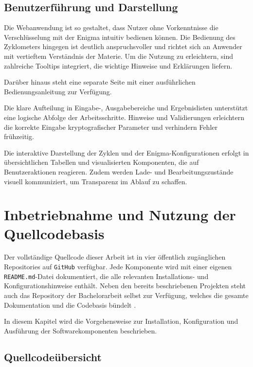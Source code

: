 \documentclass[12pt, ngerman, a4paper, numbers=noenddot]{article}
\begin{document}
\subsection{Benutzerführung und Darstellung}

Die Webanwendung ist so gestaltet, dass Nutzer ohne Vorkenntnisse die Verschlüsselung mit der Enigma intuitiv bedienen können. Die Bedienung des Zyklometers hingegen ist deutlich anspruchsvoller und richtet sich an Anwender mit vertieftem Verständnis der Materie. Um die Nutzung zu erleichtern, sind zahlreiche Tooltips integriert, die wichtige Hinweise und Erklärungen liefern.

Darüber hinaus steht eine separate Seite mit einer ausführlichen Bedienungsanleitung zur Verfügung.

Die klare Aufteilung in Eingabe-, Ausgabebereiche und Ergebnislisten unterstützt eine logische Abfolge der Arbeitsschritte. Hinweise und Validierungen erleichtern die korrekte Eingabe kryptografischer Parameter und verhindern Fehler frühzeitig.

Die interaktive Darstellung der Zyklen und der Enigma-Konfigurationen erfolgt in übersichtlichen Tabellen und visualisierten Komponenten, die auf Benutzeraktionen reagieren. Zudem werden Lade- und Bearbeitungszustände visuell kommuniziert, um Transparenz im Ablauf zu schaffen.


\newpage
\section{Inbetriebnahme und Nutzung der Quellcodebasis}
\label{sec:nutzung}

Der vollständige Quellcode dieser Arbeit ist in vier öffentlich zugänglichen Repositories auf \lstinline|GitHub| verfügbar. Jede Komponente wird mit einer eigenen \lstinline|README.md|-Datei dokumentiert, die alle relevanten Installations- und Konfigurationshinweise enthält. Neben den bereits beschriebenen Projekten steht auch das Repository der Bachelorarbeit selbst zur Verfügung, welches die gesamte Dokumentation und die Codebasis bündelt \autocite{bibblecode2025enigmazyklometer}.

In diesem Kapitel wird die Vorgehensweise zur Installation, Konfiguration und Ausführung der Softwarekomponenten beschrieben.


\subsection{Quellcodeübersicht}
\end{document}
